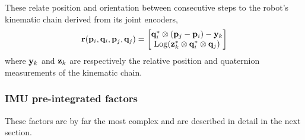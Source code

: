 These relate position and orientation between consecutive steps to the robot's kinematic chain derived from its joint encoders,
%
\begin{align}
{\bf r}({\bf p}_i,{\bf q}_i,{\bf p}_j,{\bf q}_j) = \begin{bmatrix}
{\bf q}_i^*\otimes({\bf p}_j-{\bf p}_i) - {\bf y}_k \\
\operatorname*{Log}({\bf z}_k^*\otimes{\bf q}_i^*\otimes{\bf q}_j)
\end{bmatrix}
\end{align}
%
where ${\bf y}_k$ and ${\bf z}_k$ are respectively the relative position and quaternion measurements of the kinematic chain.

\subsubsection{IMU pre-integrated factors}

These factors are by far the most complex and are described in detail in the next section.
